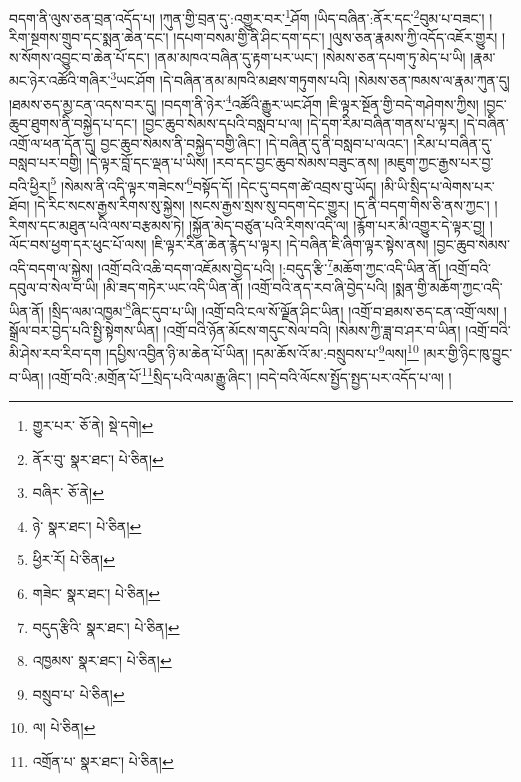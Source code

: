 བདག་ནི་ལུས་ཅན་བྲན་འདོད་པ། །ཀུན་གྱི་བྲན་དུ་:འགྱུར་བར་\footnote{གྱུར་པར་  ཅོ་ནེ།  སྡེ་དགེ། }ཤོག །ཡིད་བཞིན་:ནོར་དང་\footnote{ནོར་བུ་  སྣར་ཐང་།  པེ་ཅིན། }བུམ་པ་བཟང་། །རིག་སྔགས་གྲུབ་དང་སྨན་ཆེན་དང་། །དཔག་བསམ་གྱི་ནི་ཤིང་དག་དང་། །ལུས་ཅན་རྣམས་ཀྱི་འདོད་འཇོར་གྱུར། །ས་སོགས་འབྱུང་བ་ཆེན་པོ་དང་། །ནམ་མཁའ་བཞིན་དུ་རྟག་པར་ཡང་། །སེམས་ཅན་དཔག་ཏུ་མེད་པ་ཡི། །རྣམ་མང་ཉེར་འཚོའི་གཞིར་\footnote{བཞིར་  ཅོ་ནེ། }ཡང་ཤོག །དེ་བཞིན་ནམ་མཁའི་མཐས་གཏུགས་པའི། །སེམས་ཅན་ཁམས་ལ་རྣམ་ཀུན་དུ། །ཐམས་ཅད་མྱ་ངན་འདས་བར་དུ། །བདག་ནི་ཉེར་\footnote{ཉེ་  སྣར་ཐང་།  པེ་ཅིན། }འཚོའི་རྒྱུར་ཡང་ཤོག །ཇི་ལྟར་སྔོན་གྱི་བདེ་གཤེགས་ཀྱིས། །བྱང་ཆུབ་ཐུགས་ནི་བསྐྱེད་པ་དང་། །བྱང་ཆུབ་སེམས་དཔའི་བསླབ་པ་ལ། །དེ་དག་རིམ་བཞིན་གནས་པ་ལྟར། །དེ་བཞིན་འགྲོ་ལ་ཕན་དོན་དུ། བྱང་ཆུབ་སེམས་ནི་བསྐྱེད་བགྱི་ཞིང་། །དེ་བཞིན་དུ་ནི་བསླབ་པ་ལའང་། །རིམ་པ་བཞིན་དུ་བསླབ་པར་བགྱི། །དེ་ལྟར་བློ་དང་ལྡན་པ་ཡིས། །རབ་དང་བྱང་ཆུབ་སེམས་བཟུང་ནས། །མཇུག་ཀྱང་རྒྱས་པར་བྱ་བའི་ཕྱིར།\footnote{ཕྱིར་རོ།  པེ་ཅིན། } །སེམས་ནི་འདི་ལྟར་གཟེངས་\footnote{གཟེང་  སྣར་ཐང་།  པེ་ཅིན། }བསྟོད་དོ། །དེང་དུ་བདག་ཚེ་འབྲས་བུ་ཡོད། །མི་ཡི་སྲིད་པ་ལེགས་པར་ཐོབ། །དེ་རིང་སངས་རྒྱས་རིགས་སུ་སྐྱེས། །སངས་རྒྱས་སྲས་སུ་བདག་དེང་གྱུར། །ད་ནི་བདག་གིས་ཅི་ནས་ཀྱང་། །རིགས་དང་མཐུན་པའི་ལས་བརྩམས་ཏེ། །སྐྱོན་མེད་བཙུན་པའི་རིགས་འདི་ལ། །རྙོག་པར་མི་འགྱུར་དེ་ལྟར་བྱ། །ལོང་བས་ཕྱག་དར་ཕུང་པོ་ལས། །ཇི་ལྟར་རིན་ཆེན་རྙེད་པ་ལྟར། །དེ་བཞིན་ཇི་ཞིག་ལྟར་སྟེས་ནས། །བྱང་ཆུབ་སེམས་འདི་བདག་ལ་སྐྱེས། །འགྲོ་བའི་འཆི་བདག་འཇོམས་བྱེད་པའི། །:བདུད་རྩི་\footnote{བདུད་རྩིའི་  སྣར་ཐང་།  པེ་ཅིན། }མཆོག་ཀྱང་འདི་ཡིན་ནོ། །འགྲོ་བའི་དབུལ་བ་སེལ་བ་ཡི། །མི་ཟད་གཏེར་ཡང་འདི་ཡིན་ནོ། །འགྲོ་བའི་ནད་རབ་ཞི་བྱེད་པའི། །སྨན་གྱི་མཆོག་ཀྱང་འདི་ཡིན་ནོ། །སྲིད་ལམ་འཁྱམ་\footnote{འཁྱམས་  སྣར་ཐང་།  པེ་ཅིན། }ཞིང་དུབ་པ་ཡི། །འགྲོ་བའི་ངལ་སོ་ལྗོན་ཤིང་ཡིན། །འགྲོ་བ་ཐམས་ཅད་ངན་འགྲོ་ལས། །སྒྲོལ་བར་བྱེད་པའི་སྤྱི་སྟེགས་ཡིན། །འགྲོ་བའི་ཉོན་མོངས་གདུང་སེལ་བའི། །སེམས་ཀྱི་ཟླ་བ་ཤར་བ་ཡིན། །འགྲོ་བའི་མི་ཤེས་རབ་རིབ་དག །དཔྱིས་འབྱིན་ཉི་མ་ཆེན་པོ་ཡིན། །དམ་ཆོས་འོ་མ་:བསྲུབས་པ་\footnote{བསྲུབ་པ་  པེ་ཅིན། }ལས།\footnote{ལ།  པེ་ཅིན། } །མར་གྱི་ཉིང་ཁུ་བྱུང་བ་ཡིན། །འགྲོ་བའི་:མགྲོན་པོ་\footnote{འགྲོན་པ་  སྣར་ཐང་།  པེ་ཅིན། }སྲིད་པའི་ལམ་རྒྱུ་ཞིང་། །བདེ་བའི་ལོངས་སྤྱོད་སྤྱད་པར་འདོད་པ་ལ། །
